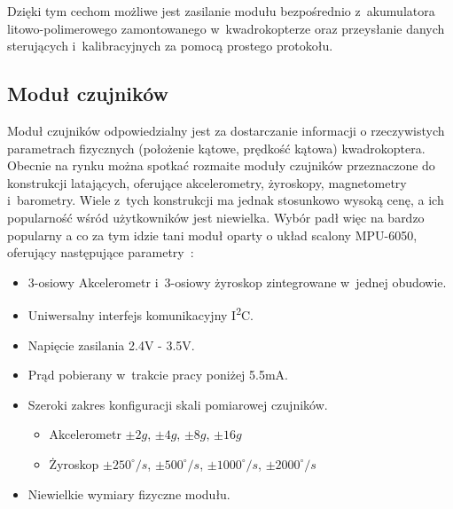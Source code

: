 \documentclass[11pt, twoside]{Thesis} %
\begin{document}
Dzięki tym cechom możliwe jest zasilanie modułu bezpośrednio z~akumulatora litowo-polimerowego zamontowanego w~kwadrokopterze oraz przeysłanie danych sterujących i~kalibracyjnych za pomocą prostego protokołu.

\subsection{Moduł czujników}
Moduł czujników odpowiedzialny jest za dostarczanie informacji o rzeczywistych parametrach fizycznych (położenie kątowe, prędkość kątowa) kwadrokoptera. Obecnie na rynku można spotkać rozmaite moduły czujników przeznaczone do konstrukcji latających, oferujące akcelerometry, żyroskopy, magnetometry i~barometry. Wiele z~tych konstrukcji ma jednak stosunkowo wysoką cenę, a ich popularność wśród użytkowników jest niewielka. Wybór padł więc na bardzo popularny a co za tym idzie tani moduł oparty o układ scalony MPU-6050, oferujący następujące parametry~\cite{ds_mpu6050, ds_mpu6050rm}:

\begin{itemize}
	\item 3-osiowy Akcelerometr i~3-osiowy żyroskop zintegrowane w~jednej obudowie.
	\item Uniwersalny interfejs komunikacyjny I\textsuperscript{2}C.
	\item Napięcie zasilania 2.4V - 3.5V.
	\item Prąd pobierany w~trakcie pracy poniżej 5.5mA.
	\item Szeroki zakres konfiguracji skali pomiarowej czujników.
		\begin{itemize}
			\item Akcelerometr $\pm 2g$, $\pm 4g$, $\pm 8g$, $\pm 16g$
			\item Żyroskop $\pm 250^{\circ}/s$, $\pm 500^{\circ}/s$, $\pm 1000^{\circ}/s$, $\pm 2000^{\circ}/s$
		\end{itemize}
	\item Niewielkie wymiary fizyczne modułu.
\end{itemize}
\end{document}
